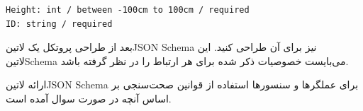 \begin{latin}
\begin{verbatim}
Height: int / between -100cm to 100cm / required
ID: string / required
\end{verbatim}
\end{latin}

بعد از طراحی پروتکل یک ‌لاتین{JSON Schema} نیز برای آن طراحی کنید.
این ‌لاتین{Schema} می‌بایست خصوصیات ذکر شده برای هر ارتباط را در نظر گرفته باشد.



\begin{پاسخ}

 ارائه ‌لاتین{JSON Schema} برای عملگرها و سنسورها
 استفاده از قوانین صحت‌سنجی بر اساس آنچه در صورت سوال آمده است.

\end{پاسخ}

